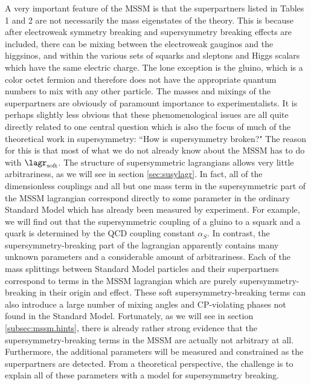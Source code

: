 A very important feature of the MSSM is that the
superpartners listed in Tables 1 and 2 are not necessarily the
mass eigenstates of the theory. This is because after electroweak
symmetry breaking and supersymmetry breaking effects are included,
there can be mixing between the electroweak gauginos and the higgsinos,
and within the various sets of squarks and sleptons and Higgs
scalars which have the same electric
charge. The lone exception is the gluino, which is a color octet fermion
and therefore does
not have the appropriate quantum numbers to mix with any other particle.
The masses and mixings of the superpartners are obviously of paramount
importance to experimentalists. It is perhaps slightly less obvious that
these phenomenological issues are all quite directly related to one
central question which is also
the focus of much of the theoretical work in supersymmetry:
``How is supersymmetry broken?" The reason for this is that most
of what we do not already know about the MSSM has to do with
$\lagr_{\rm soft}$. The structure of supersymmetric lagrangians
allows very little arbitrariness, as we will see in section
\ref{sec:susylagr}. In fact, all of the dimensionless couplings
and all but one mass term in the supersymmetric part of the
MSSM lagrangian correspond directly to some parameter in the ordinary
Standard Model which has already been measured by
experiment. For example, we will find out that
the supersymmetric coupling of a gluino to
a squark and a quark is determined by
the QCD coupling constant $\alpha_S$. In contrast, the
supersymmetry-breaking part of the lagrangian apparently contains
many unknown parameters and a considerable amount of arbitrariness.
Each of the mass splittings
between Standard Model particles and their superpartners correspond
to terms in the MSSM lagrangian which are purely supersymmetry-breaking
in their origin and effect.
These soft supersymmetry-breaking terms can also introduce a
large number of mixing angles and
CP-violating phases not found in the Standard Model.
Fortunately, as we will see in section \ref{subsec:mssm.hints}, there is
already
rather strong evidence that the supersymmetry-breaking terms
in the MSSM are actually not arbitrary at all.
Furthermore, the additional parameters will be measured
and constrained as the superpartners are detected. From a theoretical
perspective, the challenge is to explain all of these parameters with
a model for supersymmetry breaking.

